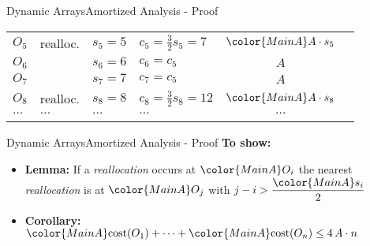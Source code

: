 \begin{frame}{Dynamic Arrays}{Amortized Analysis - Proof}
\begin{table}[!h]
\begin{tabular}{|l|l|l|l|c|@{}l}
      \cmidrule{1-5}
      $O_5$ & {\color{MainA}realloc.} &
      $s_5 = 5$ & {\color{MainA}$c_5 = \frac{3}{2} s_5 = 7$} &
      ${\color{MainA}A \cdot s_5}$ &
      \raisebox{-0.5em}{\multirow{3}{*}{%
        $\left.\begin{array}{@{}l@{}}\\[3.25em]\end{array}\right\rbrace
        \begin{array}{@{}l@{}}
          \text{distance}\\
          3 \geq \left\lfloor\dfrac{{\color{MainA}s_5}}{2}\right\rfloor
        \end{array}$%
      }}\\
      $O_6$ & {} & $s_6 = 6$ & $c_6 = c_5$ & $A$\\
      $O_7$ & {} & $s_7 = 7$ & $c_7 = c_5$ & $A$\\
      \cmidrule{1-5}
      $O_8$ & {\color{MainA}realloc.} &
      $s_8 = 8$ & {\color{MainA}$c_8 = \frac{3}{2} s_8 = 12$} &
      ${\color{MainA}A \cdot s_8}$\\
      $\dots$ & $\dots$ & $\dots$ & $\dots$ & $\dots$\\
      \addlinespace[0.5\aboverulesep]\cmidrule[\heavyrulewidth]{1-5}
    \end{tabular}
  \end{table}
\end{frame}


\begin{frame}{Dynamic Arrays}{Amortized Analysis - Proof}
  \textbf{To show:}
  \begin{itemize}
    \item
      \textbf{Lemma:}
      If a \textit{reallocation} occurs at ${\color{MainA}O_i}$
      the nearest \textit{reallocation} is at ${\color{MainA}O_j}$
      with $j - i > \dfrac{{\color{MainA}s_i}}{2}$
    \item
      \textbf{Corollary:}
      ${\color{MainA}\mathrm{cost}(O_1)}+\dots
        +{\color{MainA}\mathrm{cost}(O_n)} \leq 4 \, A \cdot n$
  \end{itemize}
\end{frame}


